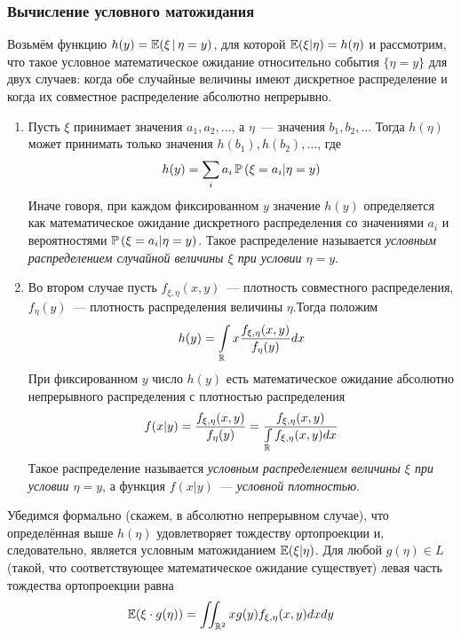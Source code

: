     \subsubsection{Вычисление условного матожидания}
    Возьмём функцию $h(y)=\operatorname{\mathbb{E}} (\xi \,|\, \eta=y)$, для которой $\operatorname{\mathbb{E}} (\xi | \eta)=h(\eta)$ и рассмотрим, что такое условное математическое ожидание относительно события $\{\eta=y\}$ для двух случаев: когда обе случайные величины имеют дискретное распределение и когда их совместное распределение абсолютно непрерывно.
    \begin{enumerate}
        \item Пусть $\xi$ принимает значения $a_{1}, a_{2}, \ldots$, а $\eta$~--- значения $b_{1}, b_{2}, \ldots$ Тогда $h(\eta)$ может принимать только значения $h\left(b_{1}\right), h\left(b_{2}\right), \ldots$, где
        \begin{equation*}
            h(y)=\sum\limits_{i} a_{i} \operatorname{\mathbb{P}}\left(\xi=a_{i} | \eta=y\right)
        \end{equation*}
        Иначе говоря, при каждом фиксированном $y$ значение $h(y)$ определяется как математическое ожидание дискретного распределения со значениями $a_{i}$ и вероятностями $\operatorname{\mathbb{P}}\left(\xi=a_{i} | \eta=y\right)$. Такое распределение называется \textit{условным распределением случайной величины $\xi$ при условии $\eta = y$}.
        
        \item Во втором случае пусть $f_{\xi, \eta}(x, y)$~--- плотность совместного распределения, $f_{\eta}(y)$~--- плотность распределения величины $\eta$.Тогда положим
        \begin{equation*}
            h(y)=\int\limits_{\mathbb{R}} x \frac{f_{\xi, \eta}(x, y)}{f_{\eta}(y)} dx
        \end{equation*}
        При фиксированном $y$ число $h(y)$ есть математическое ожидание абсолютно непрерывного распределения с плотностью распределения
        \begin{equation*}
            f(x | y)=\frac{f_{\xi, \eta}(x, y)}{f_{\eta}(y)}=\frac{f_{\xi, \eta}(x, y)}{\int\limits_{\mathbb{R}} f_{\xi, \eta}(x, y) dx}
        \end{equation*}
        Такое распределение называется \textit{условным распределением величины $\xi$ при условии $\eta = y$}, а функция $f(x | y)$~--- \textit{условной плотностью}.
    \end{enumerate}
    

        Убедимся формально (скажем, в абсолютно непрерывном случае), что определённая выше $h(\eta)$ удовлетворяет тождеству ортопроекции и, следовательно, является условным матожиданием $\operatorname{\mathbb{E}} (\xi | \eta)$. Для любой $g(\eta) \in L$ (такой, что соответствующее математическое ожидание существует) левая часть тождества ортопроекции равна
        \begin{equation*}
            \operatorname{\mathbb{E}} (\xi \cdot g(\eta))=\iint_{\mathbb{R}^{2}} x g(y) f_{\xi, \eta}(x, y) dxdy
        \end{equation*}
        
